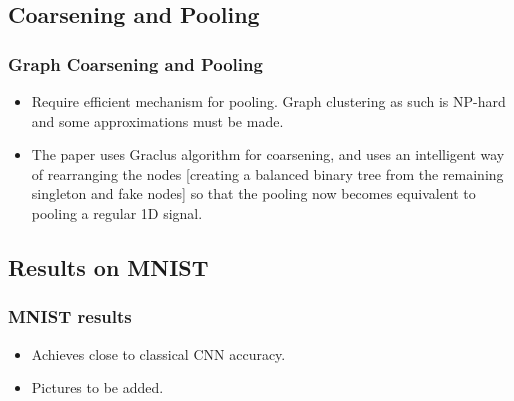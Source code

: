 \documentclass{beamer}
\begin{document}
\subsection{Coarsening and Pooling}
\begin{frame}
  \frametitle{Graph Coarsening and Pooling}
  \begin{itemize}
  \item Require efficient mechanism for pooling. Graph clustering as such is NP-hard and some approximations must be made.
  \item The paper uses Graclus algorithm for coarsening, and uses an intelligent way of rearranging the nodes [creating a balanced binary tree from the remaining singleton and fake nodes] so that the pooling now becomes equivalent to pooling a regular 1D signal.
  \end{itemize}
\end{frame}

\subsection{Results on MNIST}
\begin{frame}
  \frametitle{MNIST results}
  \begin{itemize}
  \item Achieves close to classical CNN accuracy.
  \item Pictures to be added.
  \end{itemize}
\end{frame}




\end{document}
